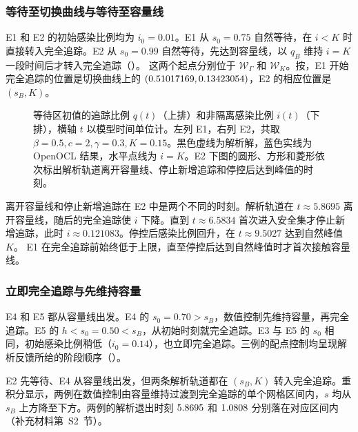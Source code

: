 \documentclass[lang=cn,a4paper,newtx]{elegantpaper}
\theoremstyle{plain}
\theoremstyle{definition}
\begin{document}
\subsubsection{等待至切换曲线与等待至容量线}

E1 和 E2 的初始感染比例均为 $i_0=0.01$。E1 从 $s_0=0.75$ 自然等待，在 $i<K$ 时直接转入完全追踪。E2 从 $s_0=0.99$ 自然等待，先达到容量线，以 $q_B$ 维持 $i=K$ 一段时间后才转入完全追踪（）。
这两个起点分别位于 $\mathcal W_\Gamma$ 和 $\mathcal W_K$。按，E1 开始完全追踪的位置是切换曲线上的 $(0.51017169,0.13423054)$，E2 的相应位置是 $(s_B,K)$。

\begin{figure}[!htbp]
\centering
{}
\caption{等待区初值的追踪比例 $q(t)$（上排）和非隔离感染比例 $i(t)$（下排），横轴 $t$ 以模型时间单位计。左列 E1，右列 E2，共取 $\beta=0.5,c=2,\gamma=0.3,K=0.15$。黑色虚线为解析解，蓝色实线为 OpenOCL 结果，水平点线为 $i=K$。E2 下图的圆形、方形和菱形依次标出解析轨道离开容量线、停止新增追踪和停控后达到峰值的时刻。}
\label{fig:numerical-waiting}
\end{figure}

离开容量线和停止新增追踪在 E2 中是两个不同的时刻。解析轨道在 $t\approx5.8695$ 离开容量线，随后的完全追踪使 $i$ 下降。直到 $t\approx6.5834$ 首次进入安全集才停止新增追踪，此时 $i\approx0.121083$。停控后感染比例回升，在 $t\approx9.5027$ 达到自然峰值 $K$。
E1 在完全追踪前始终低于上限，直至停控后达到自然峰值时才首次接触容量线。

\subsubsection{立即完全追踪与先维持容量}

E4 和 E5 都从容量线出发。E4 的 $s_0=0.70>s_B$，数值控制先维持容量，再完全追踪。E5 的 $h<s_0=0.50<s_B$，从初始时刻就完全追踪。E3 与 E5 的 $s_0$ 相同，初始感染比例稍低（$i_0=0.14$），也立即完全追踪。三例的配点控制均呈现解析反馈所给的阶段顺序（）。

E2 先等待、E4 从容量线出发，但两条解析轨道都在 $(s_B,K)$ 转入完全追踪。重积分显示，两例在数值控制由容量维持过渡到完全追踪的单个网格区间内，$s$ 均从 $s_B$ 上方降至下方。两例的解析退出时刻 $\num[round-mode=places,round-precision=4]{\NumExitETwoTheory}$ 和 $\num[round-mode=places,round-precision=4]{\NumExitEFourTheory}$ 分别落在对应区间内（补充材料第~S2~节）。
\end{document}
